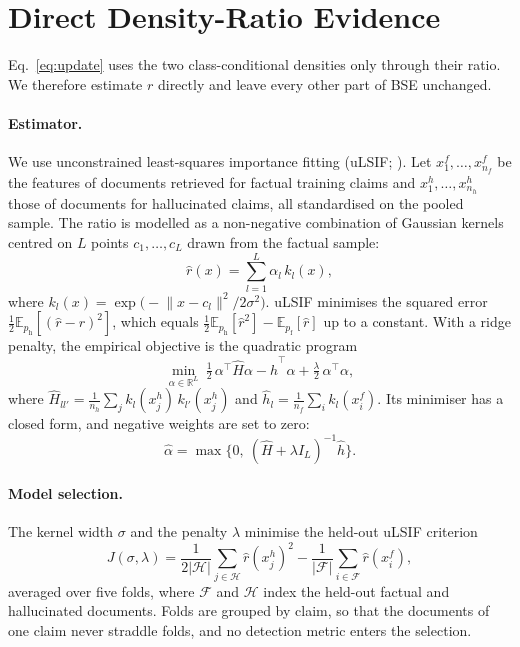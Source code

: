 \documentclass[11pt]{article}
\newcommand{\E}{\mathbb{E}}
\newcommand{\pf}{p_{\mathrm{f}}}
\newcommand{\ph}{p_{\mathrm{h}}}
\begin{document}
\section{Direct Density-Ratio Evidence}
\label{sec:method}

Eq.~\ref{eq:update} uses the two class-conditional densities only through
their ratio. We therefore estimate $r$ directly and leave every other part of
BSE unchanged.

\paragraph{Estimator.} We use unconstrained least-squares importance fitting
(uLSIF; \citealp{kanamori2009ulsif}). Let $x^f_1, \dots, x^f_{n_f}$ be the
features of documents retrieved for factual training claims and
$x^h_1, \dots, x^h_{n_h}$ those of documents for hallucinated claims, all
standardised on the pooled sample. The ratio is modelled as a non-negative
combination of Gaussian kernels centred on $L$ points $c_1, \dots, c_L$ drawn
from the factual sample:
\begin{equation}
\hat r(x) = \sum_{l=1}^{L} \alpha_l\, k_l(x),
\label{eq:model}
\end{equation}
where $k_l(x) = \exp\bigl(-\lVert x - c_l\rVert^2 / 2\sigma^2\bigr)$.
uLSIF minimises the squared error $\tfrac12 \E_{\ph}[(\hat r - r)^2]$, which
equals $\tfrac12 \E_{\ph}[\hat r^2] - \E_{\pf}[\hat r]$ up to a constant.
With a ridge penalty, the empirical objective is the quadratic program
\begin{equation}
\min_{\alpha \in \mathbb{R}^L}\ \tfrac12\, \alpha^\top \hat H \alpha
  - \hat h^\top \alpha + \tfrac{\lambda}{2}\, \alpha^\top \alpha,
\label{eq:objective}
\end{equation}
where $\hat H_{ll'} = \frac{1}{n_h}\sum_{j} k_l(x^h_j)\, k_{l'}(x^h_j)$ and
$\hat h_l = \frac{1}{n_f}\sum_{i} k_l(x^f_i)$. Its minimiser has a closed
form, and negative weights are set to zero:
\begin{equation}
\hat\alpha = \max\bigl\{0,\ (\hat H + \lambda I_L)^{-1} \hat h\bigr\}.
\label{eq:solution}
\end{equation}

\paragraph{Model selection.} The kernel width $\sigma$ and the penalty
$\lambda$ minimise the held-out uLSIF criterion
\begin{equation}
J(\sigma, \lambda) = \frac{1}{2|\mathcal{H}|}\sum_{j \in \mathcal{H}} \hat r(x^h_j)^2
  - \frac{1}{|\mathcal{F}|}\sum_{i \in \mathcal{F}} \hat r(x^f_i),
\label{eq:cv}
\end{equation}
averaged over five folds, where $\mathcal{F}$ and $\mathcal{H}$ index the
held-out factual and hallucinated documents. Folds are grouped by claim, so
that the documents of one claim never straddle folds, and no detection metric
enters the selection.
\end{document}
